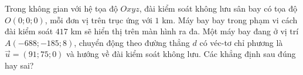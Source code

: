 \begin{ex}[CD]%
	Trong không gian với hệ tọa độ $Oxyz$, đài kiểm soát không lưu sân bay có tọa độ $O(0;0;0)$, mỗi đơn vị trên trục ứng với $1$ km. Máy bay bay trong phạm vi cách đài kiểm soát $417$ km sẽ hiển thị trên màn hình ra đa. Một máy bay đang ở vị trí $A\left(-688;-185;8\right)$, chuyển động theo đường thẳng $d$ có véc-tơ chỉ phương là $\overrightarrow{u}=(91;75;0)$ và hướng về đài kiểm soát không lưu. Các khẳng định sau đúng hay sai?
	\begin{center}
\end{center}
\end{ex}

